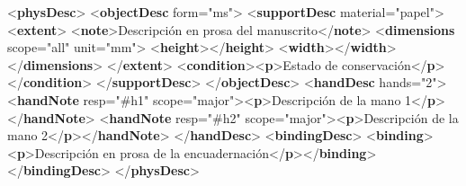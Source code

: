 \documentclass[
]{book}
\newenvironment{Shaded}{\begin{snugshade}}{\end{snugshade}}
\newcommand{\KeywordTok}[1]{\textcolor[rgb]{0.13,0.29,0.53}{\textbf{#1}}}
\newcommand{\NormalTok}[1]{#1}
\newcommand{\OtherTok}[1]{\textcolor[rgb]{0.56,0.35,0.01}{#1}}
\newcommand{\StringTok}[1]{\textcolor[rgb]{0.31,0.60,0.02}{#1}}
\begin{document}
\begin{Shaded}
\begin{Highlighting}[]
\NormalTok{\textless{}}\KeywordTok{physDesc}\NormalTok{\textgreater{}}
\NormalTok{  \textless{}}\KeywordTok{objectDesc}\OtherTok{ form=}\StringTok{"ms"}\NormalTok{\textgreater{}}
\NormalTok{    \textless{}}\KeywordTok{supportDesc}\OtherTok{ material=}\StringTok{"papel"}\NormalTok{\textgreater{}}
\NormalTok{        \textless{}}\KeywordTok{extent}\NormalTok{\textgreater{}}
\NormalTok{          \textless{}}\KeywordTok{note}\NormalTok{\textgreater{}Descripción en prosa del manuscrito\textless{}/}\KeywordTok{note}\NormalTok{\textgreater{} }
\NormalTok{          \textless{}}\KeywordTok{dimensions}\OtherTok{ scope=}\StringTok{"all"}\OtherTok{ unit=}\StringTok{"mm"}\NormalTok{\textgreater{}}
\NormalTok{              \textless{}}\KeywordTok{height}\NormalTok{\textgreater{}\textless{}/}\KeywordTok{height}\NormalTok{\textgreater{} }
\NormalTok{              \textless{}}\KeywordTok{width}\NormalTok{\textgreater{}\textless{}/}\KeywordTok{width}\NormalTok{\textgreater{} }
\NormalTok{          \textless{}/}\KeywordTok{dimensions}\NormalTok{\textgreater{}}
\NormalTok{        \textless{}/}\KeywordTok{extent}\NormalTok{\textgreater{}}
\NormalTok{        \textless{}}\KeywordTok{condition}\NormalTok{\textgreater{}\textless{}}\KeywordTok{p}\NormalTok{\textgreater{}Estado de conservación\textless{}/}\KeywordTok{p}\NormalTok{\textgreater{}\textless{}/}\KeywordTok{condition}\NormalTok{\textgreater{} }
\NormalTok{    \textless{}/}\KeywordTok{supportDesc}\NormalTok{\textgreater{}}
\NormalTok{  \textless{}/}\KeywordTok{objectDesc}\NormalTok{\textgreater{}}
\NormalTok{  \textless{}}\KeywordTok{handDesc}\OtherTok{ hands=}\StringTok{"2"}\NormalTok{\textgreater{}}
\NormalTok{    \textless{}}\KeywordTok{handNote}\OtherTok{ resp=}\StringTok{"\#h1"}\OtherTok{ scope=}\StringTok{"major"}\NormalTok{\textgreater{}\textless{}}\KeywordTok{p}\NormalTok{\textgreater{}Descripción de la mano 1\textless{}/}\KeywordTok{p}\NormalTok{\textgreater{}\textless{}/}\KeywordTok{handNote}\NormalTok{\textgreater{}}
\NormalTok{    \textless{}}\KeywordTok{handNote}\OtherTok{ resp=}\StringTok{"\#h2"}\OtherTok{ scope=}\StringTok{"major"}\NormalTok{\textgreater{}\textless{}}\KeywordTok{p}\NormalTok{\textgreater{}Descripción de la mano 2\textless{}/}\KeywordTok{p}\NormalTok{\textgreater{}\textless{}/}\KeywordTok{handNote}\NormalTok{\textgreater{} }
\NormalTok{  \textless{}/}\KeywordTok{handDesc}\NormalTok{\textgreater{}}
\NormalTok{  \textless{}}\KeywordTok{bindingDesc}\NormalTok{\textgreater{} }
\NormalTok{    \textless{}}\KeywordTok{binding}\NormalTok{\textgreater{}\textless{}}\KeywordTok{p}\NormalTok{\textgreater{}Descripción en prosa de la encuadernación\textless{}/}\KeywordTok{p}\NormalTok{\textgreater{}\textless{}/}\KeywordTok{binding}\NormalTok{\textgreater{} }
\NormalTok{  \textless{}/}\KeywordTok{bindingDesc}\NormalTok{\textgreater{}}
\NormalTok{\textless{}/}\KeywordTok{physDesc}\NormalTok{\textgreater{}}
\end{Highlighting}
\end{Shaded}
\end{document}
